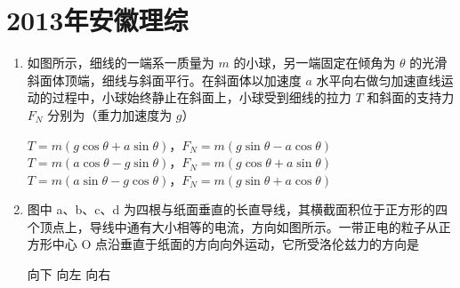 \documentclass[\gkver]{gaokaozhenti}
\begin{document}
\chapter{2013年安徽理综}

\begin{enumerate}
\item
如图所示，细线的一端系一质量为 $m$ 的小球，另一端固定在倾角为 $\theta$ 的光滑斜面体顶端，细线与斜面平行。在斜面体以加速度 $a$ 水平向右做匀加速直线运动的过程中，小球始终静止在斜面上，小球受到细线的拉力 $T$ 和斜面的支持力 $F_{N}$ 分别为（重力加速度为 $g$）


{$T=m(g\cos\theta+a\sin\theta)$，$F_{N}=m(g\sin\theta-a\cos\theta)$}
{$T=m(a\cos\theta-g\sin\theta)$，$F_{N}=m(g\cos\theta+a\sin\theta)$}
{$T=m(a\sin\theta-g\cos\theta)$，$F_{N}=m(g\sin\theta+a\cos\theta)$}


\item
图中 a、b、c、d 为四根与纸面垂直的长直导线，其横截面积位于正方形的四个顶点上，导线中通有大小相等的电流，方向如图所示。一带正电的粒子从正方形中心 O 点沿垂直于纸面的方向向外运动，它所受洛伦兹力的方向是


{向下}
{向左}
{向右}

\end{enumerate}
\end{document}
